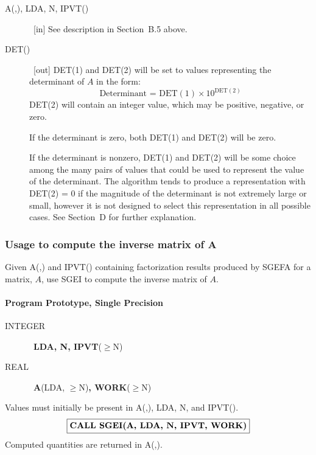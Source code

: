\documentclass[twoside]{MATH77}
\begin{document}
\begin{description}
\item[A(,), LDA, N, IPVT()] \ [in] See description in Section~B.5 above.

\item[DET()] \ [out] DET(1) and DET(2) will be set to values representing the
determinant of $A$ in the form:
\begin{equation*}
\text{Determinant = DET}(1) \times  10^{\text{DET}(2)}
\end{equation*}
DET(2) will contain an integer value, which may be positive, negative, or
zero.

If the determinant is zero, both DET(1) and DET(2) will be zero.

If the determinant is nonzero, DET(1) and DET(2) will be some choice among
the many pairs of values that could be used to represent the value of the
determinant. The algorithm tends to produce a representation with DET(2) = 0
if the magnitude of the determinant is not extremely large or small,
however it is not designed to select this representation in all possible
cases. See Section~D for further explanation.
\end{description}

\subsubsection{Usage to compute the inverse matrix of A}

Given A(,) and IPVT() containing factorization results produced by SGEFA for
a matrix, $A$, use SGEI to compute the inverse matrix of $A$.

\paragraph{Program Prototype, Single Precision}

\begin{description}

\item[INTEGER] \ {\bf LDA, N, IPVT}($\geq $N)

\item[REAL] \ {\bf A}(LDA, $\geq $N){\bf , WORK}($\geq $N)

\end{description}

Values must initially be present in A(,), LDA, N, and IPVT().
$$
\fbox{\bf CALL SGEI(A, LDA, N, IPVT, WORK)}
$$
Computed quantities are returned in A(,).
\end{document}
